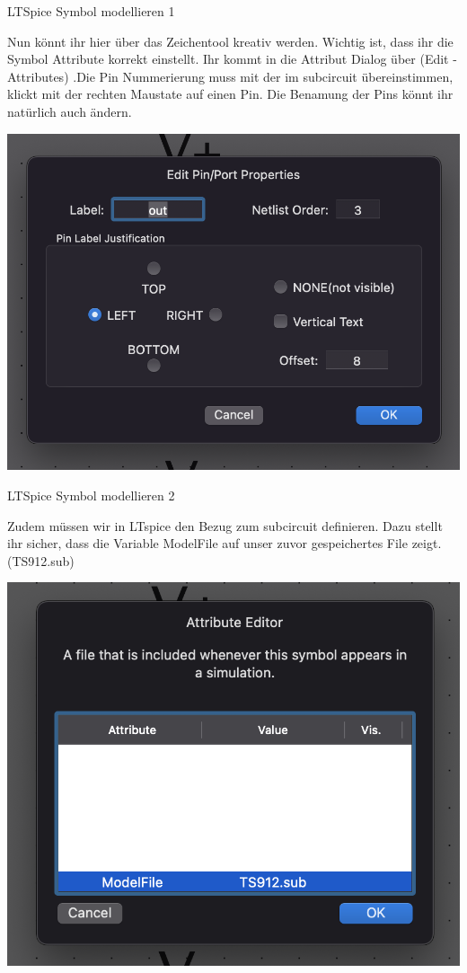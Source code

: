 \begin{frame}[t]{LTSpice Symbol modellieren 1}

    Nun könnt ihr hier über das Zeichentool kreativ werden.
    Wichtig ist, dass ihr die Symbol Attribute korrekt einstellt. Ihr kommt in
    die Attribut Dialog über (Edit -\> Attributes) .Die Pin Nummerierung muss
    mit der im subcircuit übereinstimmen, klickt mit der rechten Maustate auf einen Pin.
    Die Benamung der Pins könnt ihr natürlich auch ändern.

    \begin{spacing}{0.9} \begin{tiny}
            \begin{minipage}{\textwidth}
                \includegraphics[width=0.6\linewidth]{pictures/pinNummerierung.png}
            \end{minipage}
        \end{tiny} \end{spacing}

\end{frame}


\begin{frame}[t]{LTSpice Symbol modellieren 2}

    Zudem müssen wir in LTspice den Bezug zum subcircuit definieren. Dazu stellt ihr sicher, dass die
    Variable ModelFile auf unser zuvor gespeichertes File zeigt. (TS912.sub)

    \begin{spacing}{0.9} \begin{tiny}
            \begin{minipage}{\textwidth}
                \includegraphics[width=0.6\linewidth]{pictures/spiceModel.png}
            \end{minipage}
        \end{tiny} \end{spacing}

\end{frame}

